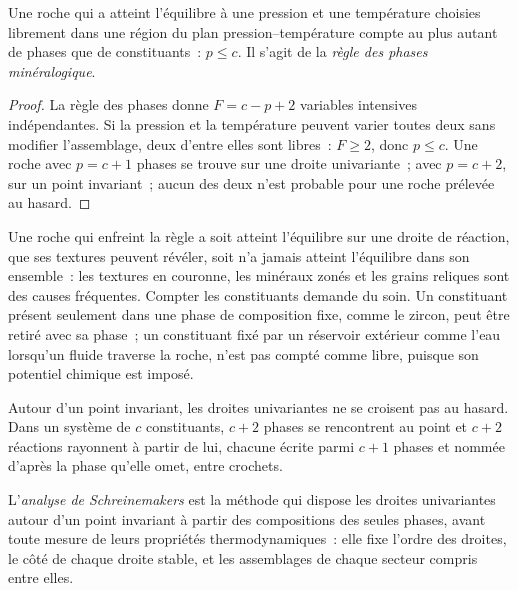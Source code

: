 \begin{proposition}\label{prop:b3:petrological-thermodynamics:goldschmidt}
Une roche qui a atteint l'équilibre à une pression et une température choisies
librement dans une région du plan pression--température compte au plus autant de
phases que de constituants~: $p \le c$. Il s'agit de la
\emph{règle des phases minéralogique}.
\end{proposition}

\begin{proof}
La règle des phases donne $F = c - p + 2$ variables intensives indépendantes. Si la
pression et la température peuvent varier toutes deux sans modifier l'assemblage, deux
d'entre elles sont libres~: $F \ge 2$, donc $p \le c$. Une roche avec $p = c + 1$ phases
se trouve sur une droite univariante~; avec $p = c + 2$, sur un point invariant~; aucun des deux
n'est probable pour une roche prélevée au hasard.
\end{proof}

Une roche qui enfreint la règle a soit atteint l'équilibre sur une droite de réaction,
que ses textures peuvent révéler, soit n'a jamais atteint l'équilibre dans son ensemble~: les textures en couronne,
les minéraux zonés et les grains reliques sont des causes fréquentes. Compter les
constituants demande du soin. Un constituant présent seulement dans une phase de composition fixe, comme
le zircon, peut être retiré avec sa phase~; un constituant fixé par un réservoir extérieur
comme l'eau lorsqu'un fluide traverse la roche, n'est pas compté
comme libre, puisque son potentiel chimique est imposé.

Autour d'un point invariant, les droites univariantes ne se croisent pas au hasard. Dans un
système de $c$ constituants, $c + 2$ phases se rencontrent au point et $c + 2$
réactions rayonnent à partir de lui, chacune écrite parmi $c + 1$ phases et nommée d'après
la phase qu'elle omet, entre crochets.

\begin{definition}\label{def:b3:petrological-thermodynamics:schreinemakers}
L'\emph{analyse de Schreinemakers} est la méthode
qui dispose les droites univariantes autour d'un point invariant à partir des
compositions des seules phases, avant toute mesure de leurs
propriétés thermodynamiques~: elle fixe l'ordre des droites, le côté de chaque
droite stable, et les assemblages de chaque secteur compris entre elles.
\end{definition}

